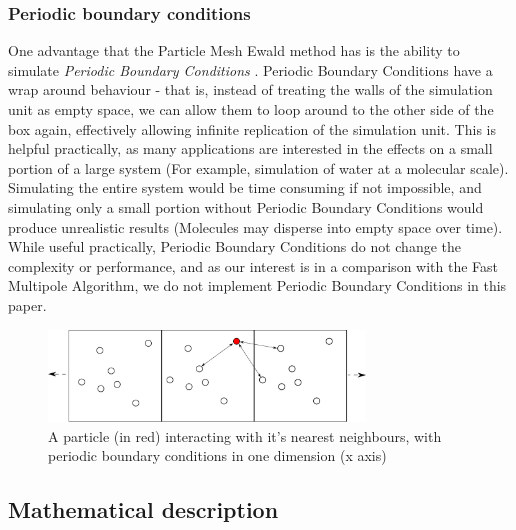\documentclass[pdftex,twoside,a4paper]{report}
\newcommand{\bcen}{\begin{center}}
\newcommand{\ecen}{\end{center}}
\newcommand{\fma}{Fast Multipole Algorithm}
\begin{document}
\subsubsection{Periodic boundary conditions}
One advantage that the Particle Mesh Ewald method has is the ability to simulate \emph{Periodic Boundary Conditions} \cite{essmann:8577}. Periodic Boundary Conditions have a wrap around behaviour - that is, instead of treating the walls of the simulation unit as empty space, we can allow them to loop around to the other side of the box again, effectively allowing infinite replication of the simulation unit. This is helpful practically, as many applications are interested in the effects on a small portion of a large system \cite{toukmaji:73} (For example, simulation of water at a molecular scale). Simulating the entire system would be time consuming if not impossible, and simulating only a small portion without Periodic Boundary Conditions would produce unrealistic results (Molecules may disperse into empty space over time). While useful practically, Periodic Boundary Conditions do not change the complexity or performance, and as our interest is in a comparison with the \fma{}, we do not implement Periodic Boundary Conditions in this paper.
\begin{figure}[H]
\bcen \includegraphics[width=0.75\textwidth]{figures/pbc.pdf} \ecen
\caption{A particle (in red) interacting with it's nearest neighbours, with periodic boundary conditions in one dimension (x axis)}
\end{figure}

\subsection{Mathematical description}
\end{document}

